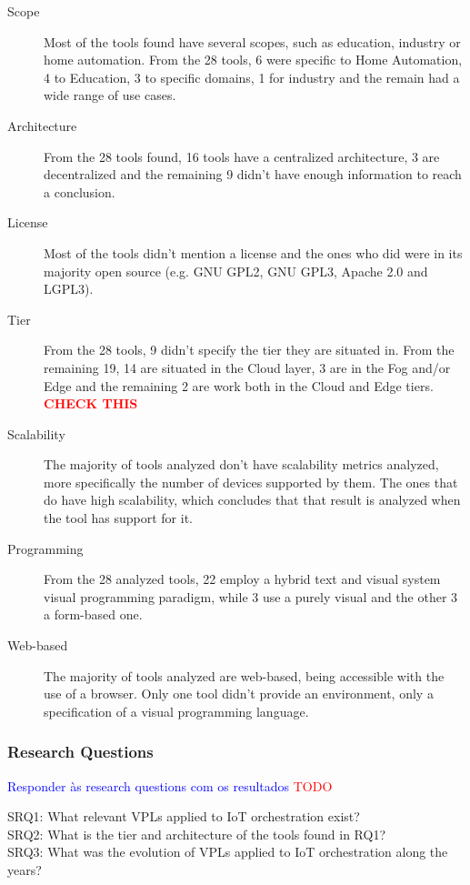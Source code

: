 \begin{description}
    \item [Scope] Most of the tools found have several scopes, such as education, industry or home automation. From the 28 tools, 6 were specific to Home Automation, 4 to Education, 3 to specific domains, 1 for industry and the remain had a wide range of use cases.
    \item [Architecture] From the 28 tools found, 16 tools have a centralized architecture, 3 are decentralized and the remaining 9 didn't have enough information to reach a conclusion.
    \item [License] Most of the tools didn't mention a license and the ones who did were in its majority open source (e.g. GNU GPL2, GNU GPL3, Apache 2.0 and LGPL3). 
    \item [Tier] From the 28 tools, 9 didn't specify the tier they are situated in. From the remaining 19, 14 are situated in the Cloud layer, 3 are in the Fog and/or Edge and the remaining 2 are work both in the Cloud and Edge tiers. \textcolor{red}{\textbf{CHECK THIS}}
    \item [Scalability] The majority of tools analyzed don't have scalability metrics analyzed, more specifically the number of devices supported by them. The ones that do have high scalability, which concludes that that result is analyzed when the tool has support for it.
    \item [Programming] From the 28 analyzed tools, 22 employ a hybrid text and visual system visual programming paradigm, while 3 use a purely visual and the other 3 a form-based one. 
    \item [Web-based] The majority of tools analyzed are web-based, being accessible with the use of a browser. Only one tool didn't provide an environment, only a specification of a visual programming language.
\end{description}

\subsubsection{Research Questions}

\textcolor{blue}{Responder às research questions com os resultados}
\textcolor{red}{TODO}
\begin{description}
    \item [SRQ1: What relevant VPLs applied to IoT orchestration exist?]
    \item [SRQ2: What is the tier and architecture of the tools found in RQ1?]
    \item [SRQ3: What was the evolution of VPLs applied to IoT orchestration along the years?]
\end{description}


